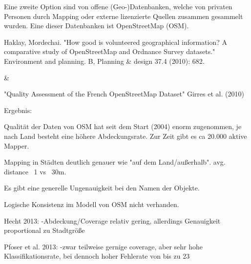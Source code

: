 Eine zweite Option sind von offene (Geo-)Datenbanken, welche von privaten Personen durch Mapping oder externe lizenzierte Quellen zusammen gesammelt wurden. Eine dieser Datenbanken ist OpenStreetMap (OSM).


Haklay, Mordechai. "How good is volunteered geographical information? A comparative study of OpenStreetMap and Ordnance Survey datasets." Environment and planning. B, Planning \& design 37.4 (2010): 682.

\&

"Quality Assessment of the French OpenStreetMap Dataset" Girres et al. (2010)

Ergebnis:

Qualität der Daten von OSM hat seit dem Start (2004) enorm zugenommen, je nach Land besteht eine höhere Abdeckungsrate. Zur Zeit gibt es ca 20.000 aktive Mapper.

Mapping in Städten deutlich genauer wie "auf dem Land/außerhalb".  avg. distance ~1 vs ~30m.

Es gibt eine generelle Ungenauigkeit bei den Namen der Objekte.

Logische Konsistenz im Modell von OSM nicht verhanden.

Hecht 2013:
-Abdeckung/Coverage relativ gering, allerdings Genauigkeit proportional zu Stadtgröße

Pfoser et al. 2013:
-zwar teilweise gernige coverage, aber sehr hohe Klassifikationsrate, bei dennoch hoher Fehlerate von bis zu 23%
